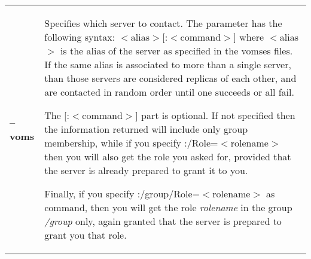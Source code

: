 \documentclass[a4paper]{book}
\begin{document}
\begin{longtable}{lp{3in}}
\textbf{--voms}     & Specifies which server to contact.  The parameter
                      has the following syntax:
                      $<$alias$>$[:$<$command$>$] where $<$alias$>$ is
                      the alias of the server as specified in the
                      vomses files.  If the same alias is associated
                      to more than a single server, than those servers
                      are considered replicas of each other, and are
                      contacted in random order until one succeeds or
                      all fail. 

		      The [:$<$command$>$] part is optional.  If not
		      specified then the information returned will
		      include only group membership, while if you
		      specify :/Role=$<$rolename$>$ then you will also get the
		      role you asked for, provided that the server is
		      already prepared to grant it to you.  

		      Finally, if you specify
		      :/group/Role=$<$rolename$>$ as command, then you
		      will get the role \emph{rolename} in the group
		      \emph{/group} only, again granted that the
		      server is prepared to grant you that role.


\end{longtable}
\end{document}
